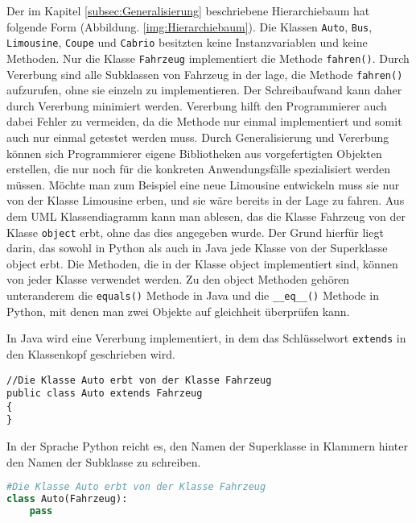 Der im Kapitel \ref{subsec:Generalisierung} beschriebene Hierarchiebaum hat folgende Form (Abbildung. \ref{img:Hierarchiebaum}). Die Klassen \texttt{Auto}, \texttt{Bus}, \texttt{Limousine}, \texttt{Coupe} und \texttt{Cabrio} besitzten keine Instanzvariablen und keine Methoden. Nur die Klasse \texttt{Fahrzeug} implementiert die Methode \texttt{fahren()}.
Durch Vererbung sind alle Subklassen von Fahrzeug in der lage, die Methode \texttt{fahren()} aufzurufen, ohne sie einzeln zu implementieren. Der Schreibaufwand kann daher durch Vererbung minimiert werden. Vererbung hilft den Programmierer auch dabei Fehler zu vermeiden, da die Methode nur einmal implementiert und somit auch nur einmal getestet werden muss. Durch Generalisierung und Vererbung können sich Programmierer eigene Bibliotheken aus vorgefertigten Objekten  erstellen, die nur noch für die konkreten Anwendungsfälle spezialisiert werden müssen. Möchte man zum Beispiel eine neue Limousine entwickeln muss sie nur von der Klasse Limousine erben, und sie wäre bereits in der Lage zu fahren. Aus dem UML Klassendiagramm kann man ablesen, das die Klasse Fahrzeug von der Klasse \texttt{object} erbt, ohne das dies angegeben wurde. Der Grund hierfür liegt darin, das sowohl in Python als auch in Java jede Klasse von der Superklasse object erbt. Die Methoden, die in der Klasse object implementiert sind, können von jeder Klasse verwendet werden. Zu den object Methoden gehören unteranderem die \texttt{equals()} Methode in Java und die \texttt{\_\_eq\_\_()} Methode in Python, mit denen man zwei Objekte auf gleichheit überprüfen kann. 

In Java wird eine Vererbung implementiert, in dem das Schlüsselwort \texttt{extends} in den Klassenkopf geschrieben wird.

\begin{lstlisting}[caption=Vererbung in Java, label=Vererbung Java]
//Die Klasse Auto erbt von der Klasse Fahrzeug
public class Auto extends Fahrzeug   
{ 
}
\end{lstlisting}

In der Sprache Python reicht es, den Namen der Superklasse in Klammern hinter den Namen der Subklasse zu schreiben.

\begin{lstlisting}[caption= Vererbung in Python \footnote{Python lässt keine leeren Klassen zu, daher muss der befehl \texttt{pass} verwendet werden}, label=lst:Vererbungpython,language=Python]
#Die Klasse Auto erbt von der Klasse Fahrzeug    
class Auto(Fahrzeug):
    pass
\end{lstlisting}


